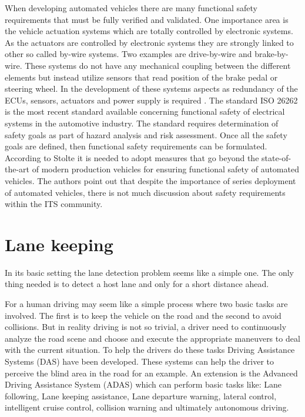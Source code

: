 When developing automated vehicles there are many functional safety requirements that must be fully verified and validated. One importance area is the vehicle actuation systems which are totally controlled by electronic systems. As the actuators are controlled by electronic systems they are strongly linked to other so called by-wire systems. Two examples are drive-by-wire and brake-by-wire. These systems do not have any mechanical coupling between the different elements but instead utilize sensors that read position of the brake pedal or steering wheel. In the development of these systems aspects as redundancy of the ECUs, sensors, actuators and power supply is required \cite{stolte2016safety}. 	The standard ISO 26262 is the most recent standard available concerning functional safety of electrical systems in the automotive industry. The standard requires determination of safety goals as part of hazard analysis and risk assessment. Once all the safety goals are defined, then functional safety requirements can be formulated.\\

According to Stolte \cite{stolte2016safety} it is needed to adopt measures that go beyond the state-of-the-art of modern production vehicles for ensuring functional safety of automated vehicles. The authors point out that despite the importance of series deployment of automated vehicles, there is not much discussion about safety requirements within the ITS community.  


\section{Lane keeping}
In its basic setting the lane detection problem seems like a simple one. The only thing needed is to detect a host lane and only for a short distance ahead.

For a human driving may seem like a simple process where two basic tasks are involved. The first is to keep the vehicle on the road and the second to avoid collisions. But in reality driving is not so trivial, a driver need to continuously analyze the road scene and choose and execute the appropriate maneuvers to deal with the current situation. To help the drivers do these tasks Driving Assistance Systems (DAS) have been developed. These systems can help the driver to perceive the blind area in the road for an example. An extension is the Advanced Driving Assistance System (ADAS) which can perform basic tasks like: Lane following, Lane keeping assistance, Lane departure warning, lateral control, intelligent cruise control, collision warning and ultimately autonomous driving.\\


